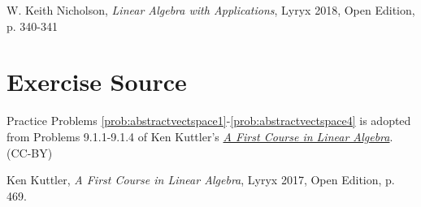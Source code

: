 \documentclass{ximera}
\begin{document}
W. Keith Nicholson, {\it Linear Algebra with Applications}, Lyryx 2018, Open Edition, p. 340-341 

\section*{Exercise Source}
Practice Problems \ref{prob:abstractvectspace1}-\ref{prob:abstractvectspace4} is adopted from Problems 9.1.1-9.1.4 of Ken Kuttler's \href{https://open.umn.edu/opentextbooks/textbooks/a-first-course-in-linear-algebra-2017}{\it A First Course in Linear Algebra}. (CC-BY)

Ken Kuttler, {\it  A First Course in Linear Algebra}, Lyryx 2017, Open Edition, p. 469.
\end{document}
